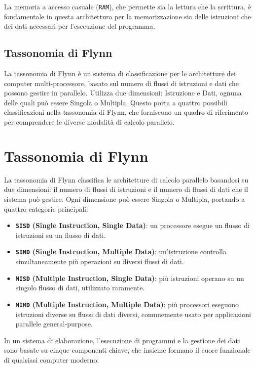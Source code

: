 La memoria a accesso casuale (\texttt{RAM}), che permette sia la lettura che la scrittura,
è fondamentale in questa architettura per la memorizzazione sia delle istruzioni
che dei dati necessari per l'esecuzione del programma.

\subsection{Tassonomia di Flynn}
La tassonomia di Flynn è un sistema di classificazione per le architetture dei computer multi-processore, basato sul numero di flussi di istruzioni e dati che possono gestire in parallelo. Utilizza due dimensioni: Istruzione e Dati, ognuna delle quali può essere Singola o Multipla. Questo porta a quattro possibili classificazioni nella tassonomia di Flynn, che forniscono un quadro di riferimento per comprendere le diverse modalità di calcolo parallelo.

\section{Tassonomia di Flynn}
La tassonomia di Flynn classifica le architetture di calcolo parallelo
basandosi su due dimensioni: il numero di flussi di istruzioni
e il numero di flussi di dati che il sistema può gestire.
Ogni dimensione può essere Singola o Multipla,
portando a quattro categorie principali:

\begin{itemize}
    \item \textbf{\texttt{SISD} (Single Instruction, Single Data)}: un processore esegue un flusso di istruzioni su un flusso di dati.
    \item \textbf{\texttt{SIMD} (Single Instruction, Multiple Data)}: un'istruzione controlla simultaneamente più operazioni su diversi flussi di dati.
    \item \textbf{\texttt{MISD} (Multiple Instruction, Single Data)}: più istruzioni operano su un singolo flusso di dati, utilizzato raramente.
    \item \textbf{\texttt{MIMD} (Multiple Instruction, Multiple Data)}: più processori eseguono istruzioni diverse su flussi di dati diversi, comunemente usato per applicazioni parallele general-purpose.
\end{itemize}

In un sistema di elaborazione, l'esecuzione di programmi e la gestione dei dati
sono basate su cinque componenti chiave, che insieme formano il cuore funzionale
di qualsiasi computer moderno:

